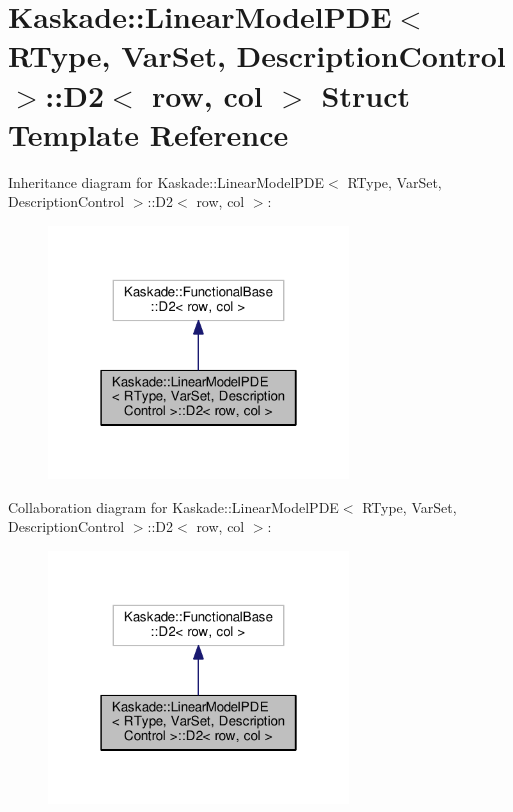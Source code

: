 \hypertarget{structKaskade_1_1LinearModelPDE_1_1D2}{\section{Kaskade\-:\-:Linear\-Model\-P\-D\-E$<$ R\-Type, Var\-Set, Description\-Control $>$\-:\-:D2$<$ row, col $>$ Struct Template Reference}
\label{structKaskade_1_1LinearModelPDE_1_1D2}
}


Inheritance diagram for Kaskade\-:\-:Linear\-Model\-P\-D\-E$<$ R\-Type, Var\-Set, Description\-Control $>$\-:\-:D2$<$ row, col $>$\-:
\nopagebreak
\begin{figure}[H]
\begin{center}
\leavevmode
\includegraphics[width=226pt]{structKaskade_1_1LinearModelPDE_1_1D2__inherit__graph}
\end{center}
\end{figure}


Collaboration diagram for Kaskade\-:\-:Linear\-Model\-P\-D\-E$<$ R\-Type, Var\-Set, Description\-Control $>$\-:\-:D2$<$ row, col $>$\-:
\nopagebreak
\begin{figure}[H]
\begin{center}
\leavevmode
\includegraphics[width=226pt]{structKaskade_1_1LinearModelPDE_1_1D2__coll__graph}
\end{center}
\end{figure}
